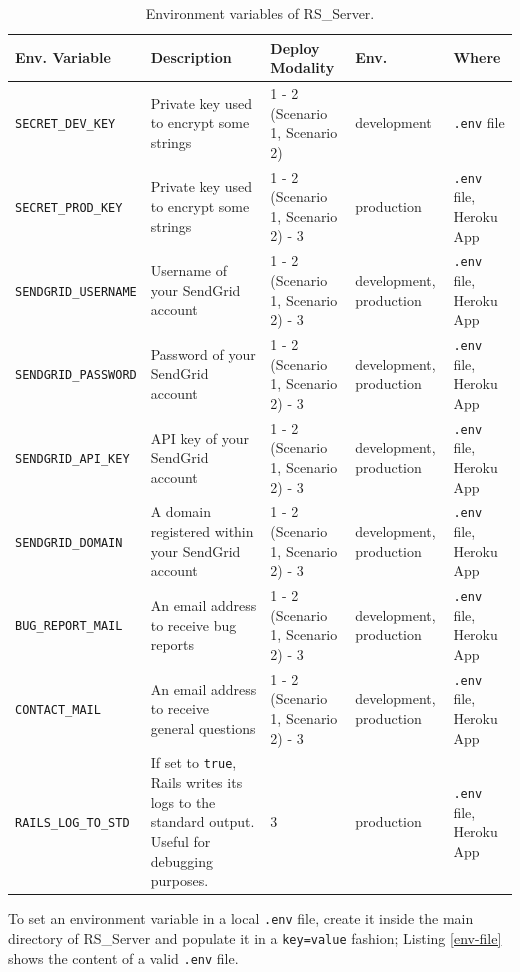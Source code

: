 \documentclass[a4paper, english]{article}
\newcounter{subsubsubsection}[subsubsection]
\begin{document}
\begin{table}
\centering
\begin{threeparttable}
\begin{tabular}{p{3.5cm}p{3cm}p{3cm}p{1.7cm}p{2cm}}
\toprule
\textbf{Env. Variable}  &\textbf{Description} & \textbf{Deploy Modality} & \textbf{Env.} & \textbf{Where} \\
\midrule
\verb|SECRET_DEV_KEY| & Private key used to encrypt some strings & 1 - 2 (Scenario 1, Scenario 2) & development & \verb|.env| file \\
\verb|SECRET_PROD_KEY| & Private key used to encrypt some strings & 1 - 2 (Scenario 1, Scenario 2) - 3 & production & \verb|.env| file, Heroku App \\
\verb|SENDGRID_USERNAME| & Username of your SendGrid account & 1 - 2 (Scenario 1, Scenario 2) - 3 & development, production & \verb|.env| file, Heroku App \\
\verb|SENDGRID_PASSWORD| & Password of your SendGrid account & 1 - 2 (Scenario 1, Scenario 2) - 3 & development, production & \verb|.env| file, Heroku App \\
\verb|SENDGRID_API_KEY| & API key of your SendGrid account & 1 - 2 (Scenario 1, Scenario 2) - 3 & development, production & \verb|.env| file, Heroku App \\
\verb|SENDGRID_DOMAIN| & A domain registered within your SendGrid account & 1 - 2 (Scenario 1, Scenario 2) - 3 & development, production & \verb|.env| file, Heroku App \\
\verb|BUG_REPORT_MAIL| & An email address to receive bug reports & 1 - 2 (Scenario 1, Scenario 2) - 3 & development, production & \verb|.env| file, Heroku App \\
\verb|CONTACT_MAIL| & An email address to receive general questions & 1 - 2 (Scenario 1, Scenario 2) - 3 & development, production & \verb|.env| file, Heroku App \\
\verb|RAILS_LOG_TO_STD| & If set to \verb|true|, Rails writes its logs to the standard output. Useful for debugging purposes. & 3 & production & \verb|.env| file, Heroku App \\
\bottomrule
\end{tabular}
\caption{Environment variables of RS\_Server.}
\label{env}
 \end{threeparttable}
\end{table}


\label{env-1}

To set an environment variable in a local \verb|.env| file, create it inside the main directory of RS\_Server and populate it in a \verb|key=value| fashion; Listing \ref{env-file} shows the content of a valid \verb|.env| file.
\end{document}
